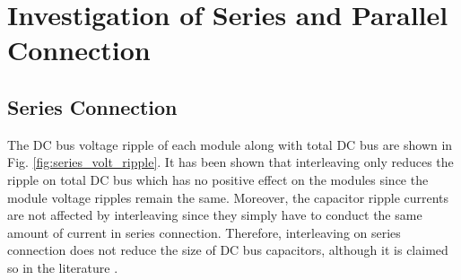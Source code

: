 \section{Investigation of Series and Parallel Connection}\label{sec:SimResults}

\subsection{Series Connection}

The DC bus voltage ripple of each module along with total DC bus are shown in Fig. \ref{fig:series_volt_ripple}. It has been shown that interleaving only reduces the ripple on total DC bus which has no positive effect on the modules since the module voltage ripples remain the same. Moreover, the capacitor ripple currents are not affected by interleaving since they simply have to conduct the same amount of current in series connection. Therefore, interleaving on series connection does not reduce the size of DC bus capacitors, although it is claimed so in the literature \cite{Wang2015b}. 


